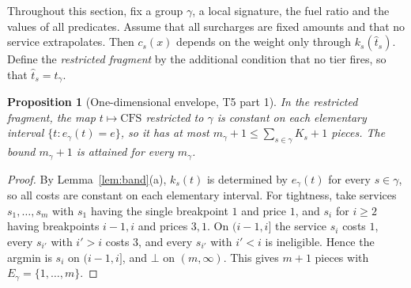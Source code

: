 \documentclass[11pt]{article}
\newtheorem{proposition}[theorem]{Proposition}
\theoremstyle{definition}
\theoremstyle{remark}
\newcommand{\cfs}{\mathrm{CFS}}
\begin{document}
Throughout this section, fix a group $\gamma$, a local signature, the fuel ratio and the
values of all predicates. Assume that all surcharges are fixed amounts and that no
service extrapolates. Then $c_s(x)$ depends on the weight only through $k_s(\hat t_s)$.
Define the \emph{restricted fragment} by the additional condition that no tier fires,
so that $\hat t_s=t_\gamma$.

\begin{proposition}[One-dimensional envelope, T5 part 1]\label{prop:T5a}
In the restricted fragment, the map $t\mapsto\cfs$ restricted to $\gamma$ is constant on each
elementary interval $\{t:e_\gamma(t)=e\}$, so it has at most $m_\gamma+1\le\sum_{s\in\gamma}K_s+1$
pieces. The bound $m_\gamma+1$ is attained for every $m_\gamma$.
\end{proposition}
\begin{proof}
By Lemma~\ref{lem:band}(a), $k_s(t)$ is determined by $e_\gamma(t)$ for every $s\in\gamma$, so all
costs are constant on each elementary interval. For tightness, take services
$s_1,\dots,s_m$ with $s_1$ having the single breakpoint $1$ and price $1$, and $s_i$ for
$i\ge2$ having breakpoints $i-1,i$ and prices $3,1$. On $(i-1,i]$ the service $s_i$ costs
$1$, every $s_{i'}$ with $i'>i$ costs $3$, and every $s_{i'}$ with $i'<i$ is ineligible. Hence
the argmin is $s_i$ on $(i-1,i]$, and $\bot$ on $(m,\infty)$. This gives $m+1$ pieces with
$E_\gamma=\{1,\dots,m\}$.
\end{proof}
\end{document}
